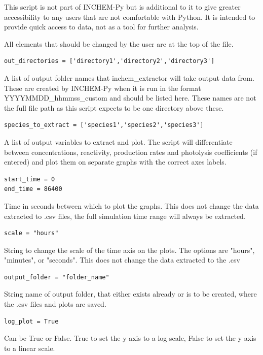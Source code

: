 \documentclass[a4paper]{refart}
\begin{document}
This script is not part of INCHEM-Py but is additional to it to give greater accessibility to any users that are not comfortable with Python. It is intended to provide quick access to data, not as a tool for further analysis.

All elements that should be changed by the user are at the top of the file.

\begin{verbatim}
out_directories = ['directory1','directory2','directory3']
\end{verbatim}
A list of output folder names that inchem\_extractor will take output data from. These are created by INCHEM-Py when it is run in the format YYYYMMDD\_hhmmss\_custom and should be listed here. These names are not the full file path as this script expects to be one directory above these.

\begin{verbatim}
species_to_extract = ['species1','species2','species3']
\end{verbatim}
A list of output variables to extract and plot. The script will differentiate between concentrations, reactivity, production rates and photolysis coefficients (if entered) and plot them on separate graphs with the correct axes labels.

\begin{verbatim}
start_time = 0
end_time = 86400
\end{verbatim}
Time in seconds between which to plot the graphs. This does not change the data extracted to .csv files, the full simulation time range will always be extracted.

\begin{verbatim}
scale = "hours"
\end{verbatim}
String to change the scale of the time axis on the plots. The options are "hours", "minutes", or "seconds". This does not change the data extracted to the .csv

\begin{verbatim}
output_folder = "folder_name"
\end{verbatim}
String name of output folder, that either exists already or is to be created, where the .csv files and plots are saved.

\begin{verbatim}
log_plot = True
\end{verbatim}
Can be True or False. True to set the y axis to a log scale, False to set the y axis to a linear scale.
\end{document}
